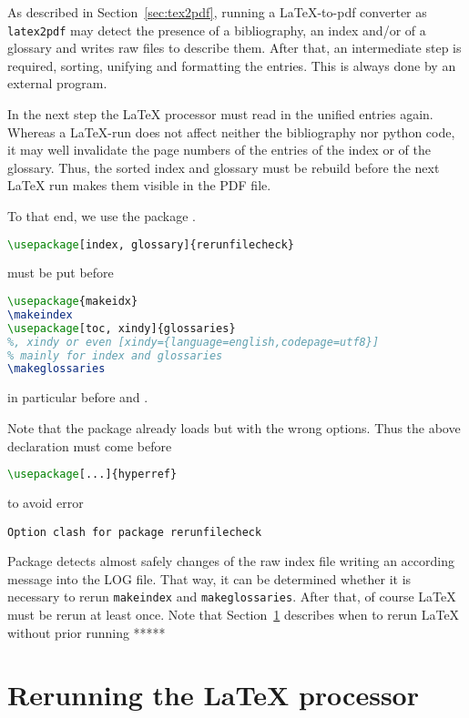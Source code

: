 As described in Section~\ref{sec:tex2pdf}, 
running a \LaTeX-to-pdf converter as \texttt{latex2pdf} 
may detect the presence of a bibliography, an index and/or of a glossary 
and writes raw files to describe them. 
After that, an intermediate step is required, 
sorting, unifying and formatting the entries. 
This is always done by an external program. 

In the next step the \LaTeX{} processor must read in the unified entries again. 
Whereas a \LaTeX-run does not affect neither the bibliography nor python code, 
it may well invalidate the page numbers 
of the entries of the index or of the glossary. 
Thus, the sorted index and glossary must be rebuild 
before the next \LaTeX{} run makes them visible in the PDF file. 

To that end, we use the package . 
%
\begin{lstlisting}[language=TeX]
\usepackage[index, glossary]{rerunfilecheck}
\end{lstlisting}
%
must be put before 
%
\begin{lstlisting}[language=TeX]
\usepackage{makeidx}
\makeindex
\usepackage[toc, xindy]{glossaries}
%, xindy or even [xindy={language=english,codepage=utf8}]
% mainly for index and glossaries 
\makeglossaries
\end{lstlisting}
%
in particular before  and . 

Note that the package  already loads  
but with the wrong options. 
Thus the above declaration must come before 
%
\begin{lstlisting}[language=TeX]
\usepackage[...]{hyperref}
\end{lstlisting}
%
to avoid error 
%
\begin{verbatim}
Option clash for package rerunfilecheck
\end{verbatim}


Package  detects almost safely 
changes of the raw index file writing an according message 
into the LOG file. 
That way, it can be determined whether it is necessary 
to rerun \texttt{makeindex} and \texttt{makeglossaries}. 
After that, of course \LaTeX{} must be rerun at least once. 
Note that Section~\ref{sec:rerunLatex} describes 
when to rerun \LaTeX{} without prior running *****

\section{Rerunning the \LaTeX{} processor}\label{sec:rerunLatex}

